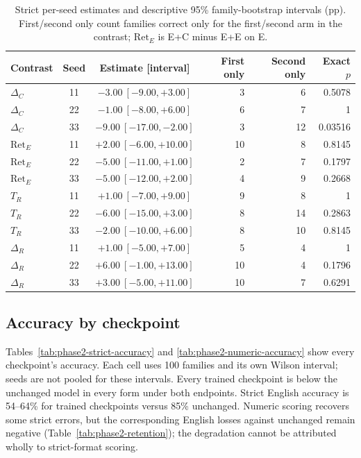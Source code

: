 \begin{table}[H]
\centering\small\singlespacing
\caption{Strict per-seed estimates and descriptive 95\% family-bootstrap intervals (pp). First/second only count families correct only for the first/second arm in the contrast; $\mathrm{Ret}_E$ is E+C minus E+E on E.}
\label{tab:phase2-seeds}
\begin{tabular}{@{}lccrrr@{}}
\toprule
Contrast & Seed & Estimate [interval] & First only & Second only & Exact $p$\\
\midrule
$\Delta_C$ & 11 & $-3.00\ [-9.00, +3.00]$ & 3 & 6 & 0.5078\\
$\Delta_C$ & 22 & $-1.00\ [-8.00, +6.00]$ & 6 & 7 & 1\\
$\Delta_C$ & 33 & $-9.00\ [-17.00, -2.00]$ & 3 & 12 & 0.03516\\
$\mathrm{Ret}_E$ & 11 & $+2.00\ [-6.00, +10.00]$ & 10 & 8 & 0.8145\\
$\mathrm{Ret}_E$ & 22 & $-5.00\ [-11.00, +1.00]$ & 2 & 7 & 0.1797\\
$\mathrm{Ret}_E$ & 33 & $-5.00\ [-12.00, +2.00]$ & 4 & 9 & 0.2668\\
$T_R$ & 11 & $+1.00\ [-7.00, +9.00]$ & 9 & 8 & 1\\
$T_R$ & 22 & $-6.00\ [-15.00, +3.00]$ & 8 & 14 & 0.2863\\
$T_R$ & 33 & $-2.00\ [-10.00, +6.00]$ & 8 & 10 & 0.8145\\
$\Delta_R$ & 11 & $+1.00\ [-5.00, +7.00]$ & 5 & 4 & 1\\
$\Delta_R$ & 22 & $+6.00\ [-1.00, +13.00]$ & 10 & 4 & 0.1796\\
$\Delta_R$ & 33 & $+3.00\ [-5.00, +11.00]$ & 10 & 7 & 0.6291\\
\bottomrule
\end{tabular}
\end{table}


\subsection{Accuracy by checkpoint}
Tables~\ref{tab:phase2-strict-accuracy} and \ref{tab:phase2-numeric-accuracy} show every checkpoint's accuracy. Each cell uses 100 families and its own Wilson interval; seeds are not pooled for these intervals. Every trained checkpoint is below the unchanged model in every form under both endpoints. Strict English accuracy is 54--64\% for trained checkpoints versus 85\% unchanged. Numeric scoring recovers some strict errors, but the corresponding English losses against unchanged remain negative (Table~\ref{tab:phase2-retention}); the degradation cannot be attributed wholly to strict-format scoring.

